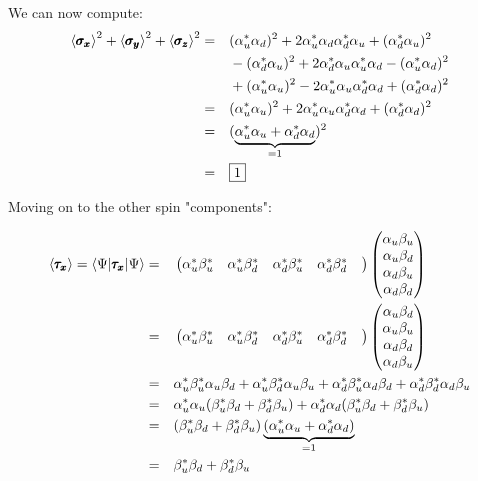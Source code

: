 \documentclass[solutions.tex]{subfiles}
\begin{document}
We can now compute:
\begin{equation*}\begin{aligned}
	\left\langle \pmb{\sigma_x} \right\rangle^2+\left\langle \pmb{\sigma_y} \right\rangle^2+\left\langle \pmb{\sigma_z} \right\rangle^2 &=&&
		(\alpha_u^*\alpha_d)^2 + 2\alpha_u^*\alpha_d\alpha_d^*\alpha_u
			+(\alpha_d^*\alpha_u)^2 \\
	~ &~&& -(\alpha_d^*\alpha_u)^2 +2\alpha_d^*\alpha_u\alpha_u^*\alpha_d
			-(\alpha_u^*\alpha_d)^2 \\
	~ &~&& +(\alpha_u^*\alpha_u)^2 -2\alpha_u^*\alpha_u\alpha_d^*\alpha_d
		+(\alpha_d^*\alpha_d)^2 \\
	~ &=&& (\alpha_u^*\alpha_u)^2 +2\alpha_u^*\alpha_u\alpha_d^*\alpha_d
		+(\alpha_d^*\alpha_d)^2 \\
	~ &=&& (\underbrace{\alpha_u^*\alpha_u + \alpha_d^*\alpha_d}_{=1})^2 \\
	~ &=&& \boxed{1} \\
\end{aligned}\end{equation*}

Moving on to the other spin "components":

\begin{equation*}\begin{aligned}
	\left\langle \pmb{\tau_x} \right\rangle = \langle \Psi|\pmb{\tau_x}|\Psi\rangle
		&=&& \begin{pmatrix}
			\alpha_u^*\beta_u^* &
			\alpha_u^*\beta_d^* &
			\alpha_d^*\beta_u^* &
			\alpha_d^*\beta_d^* &
		\end{pmatrix}\begin{pmatrix}
			\alpha_u\beta_u \\
			\alpha_u\beta_d \\
			\alpha_d\beta_u \\
			\alpha_d\beta_d \\
		\end{pmatrix} \\
	~ &=&& \begin{pmatrix}
			\alpha_u^*\beta_u^* &
			\alpha_u^*\beta_d^* &
			\alpha_d^*\beta_u^* &
			\alpha_d^*\beta_d^* &
		\end{pmatrix}\begin{pmatrix}
			\alpha_u\beta_d \\
			\alpha_u\beta_u \\
			\alpha_d\beta_d \\
			\alpha_d\beta_u \\
		\end{pmatrix} \\
	~ &=&& \alpha_u^*\beta_u^*\alpha_u\beta_d
		+\alpha_u^*\beta_d^*\alpha_u\beta_u
		+\alpha_d^*\beta_u^*\alpha_d\beta_d
		+\alpha_d^*\beta_d^*\alpha_d\beta_u \\
	~ &=&& \alpha_u^*\alpha_u(
			\beta_u^*\beta_d + \beta_d^*\beta_u
		) + \alpha_d^*\alpha_d(
			\beta_u^*\beta_d + \beta_d^*\beta_u
		) \\
	~ &=&& (\beta_u^*\beta_d + \beta_d^*\beta_u)
		\underbrace{(\alpha_u^*\alpha_u + \alpha_d^*\alpha_d)}_{=1} \\
	~ &=&& \beta_u^*\beta_d + \beta_d^*\beta_u \\
\end{aligned}\end{equation*}
\end{document}
